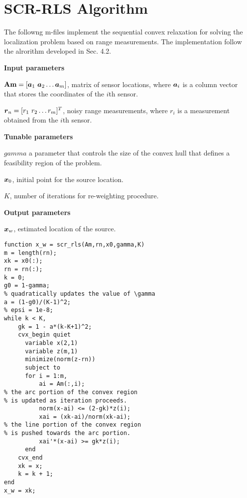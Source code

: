 \section{SCR-RLS Algorithm}

The followng m-files implement the sequential convex relaxation for solving the localization problem based on range measurements. The implementation follow the alrorithm developed in Sec. 4.2.

\phantom{m}

\noindent
\textbf{Input parameters}

\noindent
$\mbox{\textbf{Am}} = [\mbox{\boldmath$a$}_1 \ \mbox{\boldmath$a$}_2 \ldots \mbox{\boldmath$a$}_m]$, matrix of sensor locations, where $\mbox{\boldmath$a$}_i$ is a column vector that stores the coordinates of the $i$th sensor.

\noindent
$\mbox{\boldmath$r$}_n = [r_1 \ r_2 \ldots r_m]^T$, noisy range measurements, where $r_i$ is a measurement obtained from the $i$th sensor.

\noindent
\textbf{Tunable parameters}

\noindent
$gamma$ a parameter that controls the size of the convex hull that defines a feasibility region of the problem.

\noindent
$\mbox{\boldmath$x$}_0$, initial point for the source location.

\noindent
$K$, number of iterations for re-weighting procedure.

\noindent
\textbf{Output parameters}

\noindent
$\mbox{\boldmath$x$}_w$, estimated location of the source.

\phantom{m}

\begin{lstlisting}
function x_w = scr_rls(Am,rn,x0,gamma,K)
m = length(rn);
xk = x0(:);
rn = rn(:);
k = 0;
g0 = 1-gamma;
% quadratically updates the value of \gamma
a = (1-g0)/(K-1)^2;        
% epsi = 1e-8;
while k < K,
    gk = 1 - a*(k-K+1)^2;   
    cvx_begin quiet
      variable x(2,1)
      variable z(m,1)
      minimize(norm(z-rn))
      subject to
      for i = 1:m,
          ai = Am(:,i);
% the arc portion of the convex region 
% is updated as iteration proceeds.
          norm(x-ai) <= (2-gk)*z(i);  
          xai = (xk-ai)/norm(xk-ai);
% the line portion of the convex region 
% is pushed towards the arc portion.
          xai'*(x-ai) >= gk*z(i);     
      end
    cvx_end
    xk = x;
    k = k + 1;
end
x_w = xk;
\end{lstlisting}